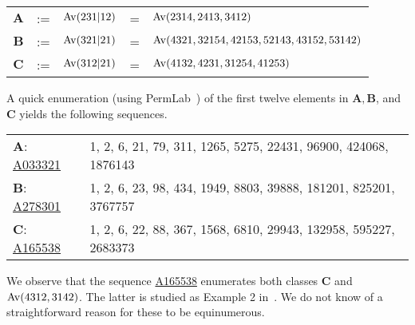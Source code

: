 \begin{center}
\begin{tabular}{c c c c l}
$\mathbf{A}$&:= & $\mathrm{Av}(231|12)$ & = & $\mathrm{Av}(2314, 2413, 3412)$ \\
$\mathbf{B}$&:= & $\mathrm{Av}(321|21)$ & = & $\mathrm{Av}(4321, 32154, 42153, 52143, 43152, 53142)$ \\
$\mathbf{C}$&:= & $\mathrm{Av}(312|21)$ & = & $\mathrm{Av}(4132, 4231, 31254, 41253)$\\  %
\end{tabular}
\end{center}

\noindent A quick enumeration (using PermLab~\cite{albertpermlab}) of the first twelve elements in $\mathbf{A}, \mathbf{B}$, and $\mathbf{C}$ yields the following sequences.

\begin{center}
\begin{tabular}{l l}
$\mathbf{A}$: \href{http://oeis.org/A033321}{A033321}& 1, 2, 6, 21, 79, 311, 1265, 5275, 22431, 96900, 424068, 1876143\\
$\mathbf{B}$: \href{http://oeis.org/A278301}{A278301}& 1, 2, 6, 23, 98, 434, 1949, 8803, 39888, 181201, 825201, 3767757\\
$\mathbf{C}$: \href{http://oeis.org/A165538}{A165538}& 1, 2, 6, 22, 88, 367, 1568, 6810, 29943, 132958, 595227, 2683373\\
\end{tabular}
\end{center}
We observe that the sequence \href{http://oeis.org/A165538}{A165538} enumerates both classes $\mathbf{C}$ and $\mathrm{Av}(4312, 3142)$. The latter is studied as Example 2 in~\cite{albert2012inflations}. We do not know of a straightforward reason for these to be equinumerous.

